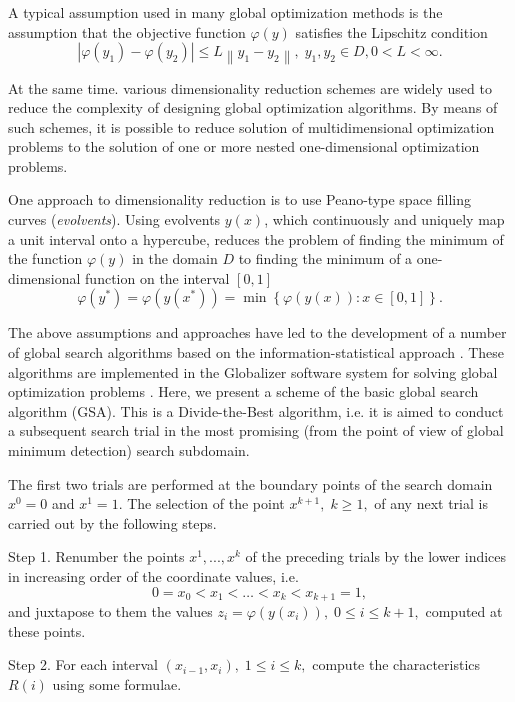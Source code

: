 \documentclass{aip-cp}
\begin{document}
A typical assumption used in many global optimization methods \cite{Evtushenko2013,Jones2009,Zilinskas2010,Pinter1996} is the assumption that the objective function $\varphi(y)$ satisfies the Lipschitz condition
\[
\left|\varphi(y_1)-\varphi(y_2)\right|\leq L\left\|y_1-y_2\right\|,\; y_1,y_2 \in D, 0<L<\infty.
\]

At the same time. various dimensionality reduction schemes are widely used to reduce the complexity of designing global optimization algorithms. By means of  such schemes, it is possible to reduce solution of multidimensional optimization problems to the solution of one or more nested one-dimensional optimization problems.

One approach to dimensionality reduction is to use Peano-type space filling curves (\textit{evolvents}). Using evolvents $y(x)$, which continuously and uniquely map a unit interval onto a hypercube, reduces the problem of finding the minimum of the function $\varphi(y)$ in the domain $D$ to finding the minimum of a one-dimensional function  on the interval $[0,1]$
\[
\varphi(y^\ast)=\varphi(y(x^\ast))=\min{\left\{\varphi(y(x)): x\in[0,1]\right\}}.
\]

The above assumptions and approaches have led to the development of a number of global search algorithms based on the information-statistical approach \cite{Strongin2000}. These algorithms are implemented in the Globalizer software system for solving global optimization problems \cite{globalizerSystem}. Here, we present a scheme of the basic global search algorithm (GSA). This is a Divide-the-Best algorithm, i.e. it is aimed to conduct a subsequent search trial in the most promising (from the point of view of global minimum detection) search subdomain.

The first two trials are performed at the boundary points of the search domain $x^0 = 0$ and $x^1 = 1$. The selection of the point  $x^{k+1}, \; k \geq 1,$  of any next trial is carried out by the following steps.

Step 1. Renumber the points  $x^1,...,x^k$ of the preceding trials by the lower indices in increasing order of the coordinate values, i.e.
\begin{equation}\label{x_i}
0=x_0<x_1<\dots <x_k<x_{k+1}=1,
\end{equation}
and juxtapose to them the values $z_i=\varphi(y(x_i)), \; 0 \leq i\leq k+1,$  computed at these points.

Step 2. For each interval $(x_{i-1},x_i), \; 1\leq i \leq k,$ compute the characteristics $R(i)$ using some formulae.
\end{document}
